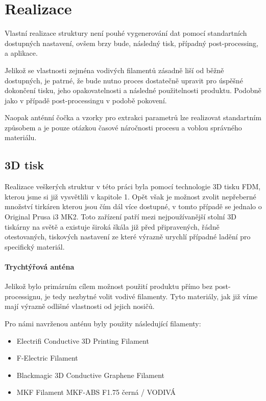 \chapter{Realizace}

Vlastní realizace struktury není pouhé vygenerování dat pomocí standartních dostupných nastavení, ovšem brzy bude, následný tisk, případný post-processing, a aplikace.

Jelikož se vlastnosti zejména vodivých filamentů zásadně liší od běžně dostupných, je patrné, že bude nutno proces dostatečně upravit pro úspěšné dokončení tisku, jeho opakovatelnosti a následné použitelnosti produktu. Podobně jako v případě post-processingu v podobě pokovení.

Naopak anténní čočka a vzorky pro extrakci parametrů lze realizovat standartním způsobem a je pouze otázkou časové náročnosti procesu a voblou správného materiálu.

\section{3D tisk}
Realizace veškerých struktur v této práci byla pomocí technologie 3D tisku FDM, kterou jsme si již vysvětlili v kapitole 1. Opět však je možnost zvolit nepřeberné množství tirkáren kterou jsou čím dál více dostupné, v tomto případě se jednalo o Original Prusa i3 MK2. Toto zařízení patří mezi nejpoužívanější stolní 3D tiskárny na světě \cite{3Dhubs} a existuje široká škála již před připravených, řádně otestovaných, tiskových nastavení ze které výrazně urychlí případné ladění pro specifický materiál.

\subsubsection{Trychtýřová anténa}
Jelikož bylo primárním cílem možnost použití produktu přímo bez post-processignu, je tedy nezbytné volit vodivé filamenty. Tyto materiály, jak již víme mají výrazně odlišné vlastnosti od jejich nosičů.

Pro námi navrženou anténu byly použity následující filamenty:
\begin{itemize}
\item Electrifi Conductive 3D Printing Filament
\item F-Electric Filament
\item Blackmagic 3D Conductive Graphene Filament
\item MKF Filament MKF-ABS F1.75 černá / VODIVÁ
\end{itemize}


